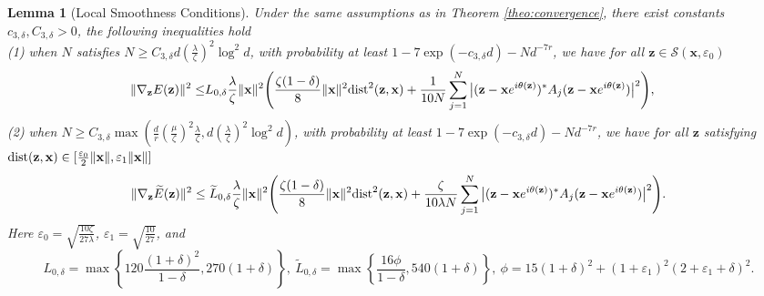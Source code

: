 \documentclass{article}
\newcommand{\calS}{{\mathcal S}}
\newcommand{\dist}{{\rm dist}}
\newcommand{\vx}{{\mathbf x}}
\newcommand{\vz}{{\mathbf z}}
\newcommand{\0}{{\mathbf 0}}
\newtheorem{lemma}[theorem]{Lemma}
\numberwithin{equation}{section}
\begin{document}
	\begin{lemma}[Local Smoothness Conditions]\label{lem:lem_smooth_cond}
		Under the same assumptions as in Theorem \ref{theo:convergence}, there exist constants $c_{3,\delta}, C_{3,\delta}>0$, the following inequalities hold\\
		(1) when $ N$ satisfies $N\ge C_{3,\delta} d\left(\frac{\lambda}{\zeta}\right)^2\log^2 d$, with probability at least $1-7\exp(-c_{3,\delta} d)-Nd^{-7r}$, we have  for all $\vz\in\calS(\vx,\varepsilon_0)$
		\begin{align*}	
			\|\nabla_{\vz} E(\vz)\|^2
			\leq& L_{0,\delta}\frac{\lambda}{\zeta}\|\vx\|^2\Bigg(\frac{\zeta(1-\delta)}{8}\|\vx\|^2\dist^2(\vz, \vx)+\frac{1}{10N}\sum_{j=1}^{N}\big|(\vz-\vx e^{i\theta(\vz)})^*A_j(\vz-\vx e^{i\theta(\vz)})\big|^2\Bigg),
		\end{align*}
		(2) when $N\ge C_{3,\delta}\max\left(\frac dr\left(\frac{\mu}{\zeta}\right)^2\frac{\lambda}{\zeta}, d\left(\frac{\lambda}{\zeta}\right)^2\log^2 d\right)$, with probability at least $1-7\exp(-c_{3,\delta} d)-Nd^{-7r}$, we have  for all $\vz$ satisfying $\dist(\vz,\vx)\in[\frac{\varepsilon_0}2\|\vx\|,\varepsilon_1\|\vx\|]$  
		\begin{equation*}	
			\|\nabla_{\vz} \widetilde E(\vz)\|^2
			\leq \widetilde L_{0,\delta}\frac{\lambda}{\zeta}\|\vx\|^2\Bigg(\frac{\zeta(1-\delta)}{8}\|\vx\|^2\dist^2(\vz, \vx)+\frac{\zeta}{10\lambda N}\sum_{j=1}^{N}\big|(\vz-\vx e^{i\theta(\vz)})^*A_j(\vz-\vx e^{i\theta(\vz)})\big|^2\Bigg).
		\end{equation*}
		Here $\varepsilon_0=\sqrt{\frac{10\zeta}{27\lambda}}$, $\varepsilon_1=\sqrt{\frac{10}{27}}$, and
		\[
		L_{0,\delta}=\max\left\{120\frac{(1+\delta)^2}{1-\delta},270(1+\delta)\right\},\ \widetilde L_{0,\delta}=\max\left\{\frac{16\phi}{1-\delta},540(1+\delta)\right\},
		\
		\phi=15(1+\delta)^2+(1+\varepsilon_1)^2(2+\varepsilon_1+\delta)^2.
		\]
	\end{lemma}
\end{document}
